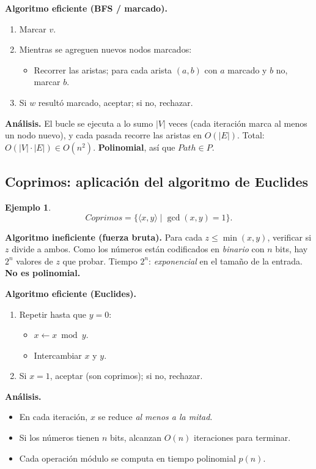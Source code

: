 \documentclass[11pt,a4paper]{article}
\theoremstyle{definicion}
\newtheorem{ejemplo}[definicion]{Ejemplo}
\newcommand{\enc}[1]{\langle #1 \rangle}
\begin{document}
\textbf{Algoritmo eficiente (BFS / marcado).}
\begin{enumerate}
    \item Marcar $v$.
    \item Mientras se agreguen nuevos nodos marcados:
    \begin{itemize}
        \item Recorrer las aristas; para cada arista $(a, b)$ con $a$ marcado y $b$ no, marcar $b$.
    \end{itemize}
    \item Si $w$ resultó marcado, aceptar; si no, rechazar.
\end{enumerate}

\textbf{Análisis.} El bucle se ejecuta a lo sumo $|V|$ veces (cada iteración marca al menos un nodo nuevo), y cada pasada recorre las aristas en $O(|E|)$. Total: $O(|V| \cdot |E|) \in O(n^2)$. \textbf{Polinomial}, así que $\mathit{Path} \in P$.

\subsection{Coprimos: aplicación del algoritmo de Euclides}

\begin{ejemplo}
\[
\mathit{Coprimos} = \{ \enc{x, y} \mid \gcd(x, y) = 1\}.
\]
\end{ejemplo}

\textbf{Algoritmo ineficiente (fuerza bruta).} Para cada $z \leq \min(x, y)$, verificar si $z$ divide a ambos. Como los números están codificados en \emph{binario} con $n$ bits, hay $2^n$ valores de $z$ que probar. Tiempo $2^n$: \emph{exponencial} en el tamaño de la entrada. \textbf{No es polinomial.}

\textbf{Algoritmo eficiente (Euclides).}
\begin{enumerate}
    \item Repetir hasta que $y = 0$:
    \begin{itemize}
        \item $x \leftarrow x \bmod y$.
        \item Intercambiar $x$ y $y$.
    \end{itemize}
    \item Si $x = 1$, aceptar (son coprimos); si no, rechazar.
\end{enumerate}

\textbf{Análisis.}
\begin{itemize}
    \item En cada iteración, $x$ se reduce \emph{al menos a la mitad}.
    \item Si los números tienen $n$ bits, alcanzan $O(n)$ iteraciones para terminar.
    \item Cada operación módulo se computa en tiempo polinomial $p(n)$.
\end{itemize}
\end{document}
